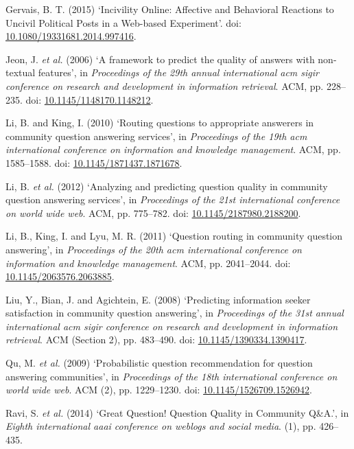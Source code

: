 \documentclass[11pt,preprint, authoryear]{article}
\numberwithin{equation}{section}
\numberwithin{figure}{section}
\numberwithin{table}{section}
\begin{document}
\hypertarget{ref-Gervais2015}{}
Gervais, B. T. (2015) `Incivility Online: Affective and Behavioral
Reactions to Uncivil Political Posts in a Web-based Experiment'. doi:
\href{https://doi.org/10.1080/19331681.2014.997416}{10.1080/19331681.2014.997416}.

\hypertarget{ref-Jeon2006}{}
Jeon, J. \emph{et al.} (2006) `A framework to predict the quality of
answers with non-textual features', in \emph{Proceedings of the 29th
annual international acm sigir conference on research and development in
information retrieval}. ACM, pp. 228--235. doi:
\href{https://doi.org/10.1145/1148170.1148212}{10.1145/1148170.1148212}.

\hypertarget{ref-Li2010}{}
Li, B. and King, I. (2010) `Routing questions to appropriate answerers
in community question answering services', in \emph{Proceedings of the
19th acm international conference on information and knowledge
management}. ACM, pp. 1585--1588. doi:
\href{https://doi.org/10.1145/1871437.1871678}{10.1145/1871437.1871678}.

\hypertarget{ref-Li2012}{}
Li, B. \emph{et al.} (2012) `Analyzing and predicting question quality
in community question answering services', in \emph{Proceedings of the
21st international conference on world wide web}. ACM, pp. 775--782.
doi:
\href{https://doi.org/10.1145/2187980.2188200}{10.1145/2187980.2188200}.

\hypertarget{ref-Li2011}{}
Li, B., King, I. and Lyu, M. R. (2011) `Question routing in community
question answering', in \emph{Proceedings of the 20th acm international
conference on information and knowledge management}. ACM, pp.
2041--2044. doi:
\href{https://doi.org/10.1145/2063576.2063885}{10.1145/2063576.2063885}.

\hypertarget{ref-Liu2008}{}
Liu, Y., Bian, J. and Agichtein, E. (2008) `Predicting information
seeker satisfaction in community question answering', in
\emph{Proceedings of the 31st annual international acm sigir conference
on research and development in information retrieval}. ACM (Section 2),
pp. 483--490. doi:
\href{https://doi.org/10.1145/1390334.1390417}{10.1145/1390334.1390417}.

\hypertarget{ref-Qu2009}{}
Qu, M. \emph{et al.} (2009) `Probabilistic question recommendation for
question answering communities', in \emph{Proceedings of the 18th
international conference on world wide web}. ACM (2), pp. 1229--1230.
doi:
\href{https://doi.org/10.1145/1526709.1526942}{10.1145/1526709.1526942}.

\hypertarget{ref-Ravi2014}{}
Ravi, S. \emph{et al.} (2014) `Great Question! Question Quality in
Community Q\&A.', in \emph{Eighth international aaai conference on
weblogs and social media}. (1), pp. 426--435.
\end{document}
